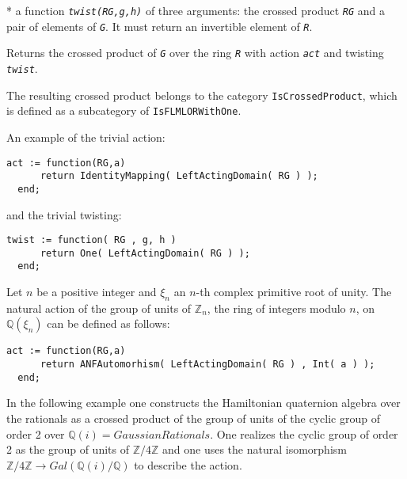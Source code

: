 \documentclass[a4paper,11pt]{report}
\begin{document}
{{{ * a function \mbox{\texttt{\mdseries\slshape twist(RG,g,h)}} of three arguments: the crossed product \mbox{\texttt{\mdseries\slshape RG}} and a pair of elements of \mbox{\texttt{\mdseries\slshape G}}. It must return an invertible element of \mbox{\texttt{\mdseries\slshape R}}. 

 

 Returns the crossed product of \mbox{\texttt{\mdseries\slshape G}} over the ring \mbox{\texttt{\mdseries\slshape R}} with action \mbox{\texttt{\mdseries\slshape act}} and twisting \mbox{\texttt{\mdseries\slshape twist}}. 

 The resulting crossed product belongs to the category  \texttt{IsCrossedProduct}, which is defined as a subcategory of \texttt{IsFLMLORWithOne}. 

 An example of the trivial action: 
\begin{Verbatim}[commandchars=!@|,fontsize=\small,frame=single,label=Example]
  act := function(RG,a)
      return IdentityMapping( LeftActingDomain( RG ) );
  end;
\end{Verbatim}
 and the trivial twisting: 
\begin{Verbatim}[commandchars=!@|,fontsize=\small,frame=single,label=Example]
  twist := function( RG , g, h )
      return One( LeftActingDomain( RG ) );
  end;
\end{Verbatim}
 Let $n$ be a positive integer and $\xi_n$ an $n$-th complex primitive root of unity. The natural action of the group of units
of ${\ensuremath{\mathbb Z}}_n$, the ring of integers modulo $n$, on ${\ensuremath{\mathbb Q}} (\xi_n)$ can be defined as follows: 
\begin{Verbatim}[commandchars=!@|,fontsize=\small,frame=single,label=Example]
  act := function(RG,a)
      return ANFAutomorhism( LeftActingDomain( RG ) , Int( a ) );
  end;
\end{Verbatim}
 In the following example one constructs the Hamiltonian quaternion algebra
over the rationals as a crossed product of the group of units of the cyclic
group of order 2 over ${\ensuremath{\mathbb Q}} (i)=GaussianRationals$. One realizes the cyclic group of order 2 as the group of units of ${\ensuremath{\mathbb Z}} / 4 {\ensuremath{\mathbb Z}}$ and one uses the natural isomorphism ${\ensuremath{\mathbb Z}} / 4 {\ensuremath{\mathbb Z}} \rightarrow Gal(
{\ensuremath{\mathbb Q}} (i)/ {\ensuremath{\mathbb Q}} )$ to describe the action. 

 
\begin{Verbatim}[commandchars=!@|,fontsize=\small,frame=single,label=Example]
  

\end{Verbatim}}}}
\end{document}
